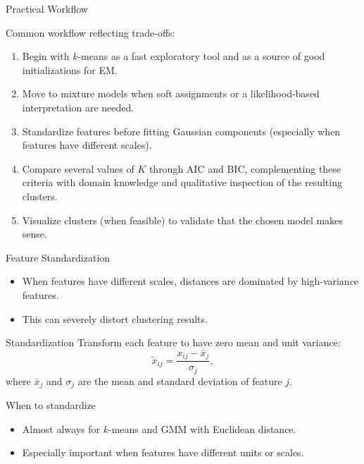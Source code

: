 \begin{frame}{Practical Workflow}
  \begin{block}{Common workflow reflecting trade-offs:}
    \begin{enumerate}
      \item Begin with \alert{$k$-means} as a fast exploratory tool and as a source of
            good initializations for EM.
      \item Move to \alert{mixture models} when soft assignments or a likelihood-based
            interpretation are needed.
      \item \alert{Standardize features} before fitting Gaussian components (especially
            when features have different scales).
      \item Compare several values of $K$ through \alert{AIC and BIC}, complementing
            these criteria with domain knowledge and qualitative inspection of the resulting
            clusters.
      \item Visualize clusters (when feasible) to validate that the chosen model makes sense.
    \end{enumerate}
  \end{block}
\end{frame}

\begin{frame}{Feature Standardization}
  \begin{itemize}
    \item When features have different scales, distances are dominated by high-variance
          features.
    \item This can severely distort clustering results.
  \end{itemize}
  \begin{block}{Standardization}
    Transform each feature to have zero mean and unit variance:
    \[
    \tilde{x}_{ij} = \frac{x_{ij} - \bar{x}_j}{\sigma_j},
    \]
    where $\bar{x}_j$ and $\sigma_j$ are the mean and standard deviation of feature $j$.
  \end{block}
  \begin{alertblock}{When to standardize}
    \begin{itemize}
      \item Almost always for $k$-means and GMM with Euclidean distance.
      \item Especially important when features have different units or scales.
    \end{itemize}
  \end{alertblock}
\end{frame}

